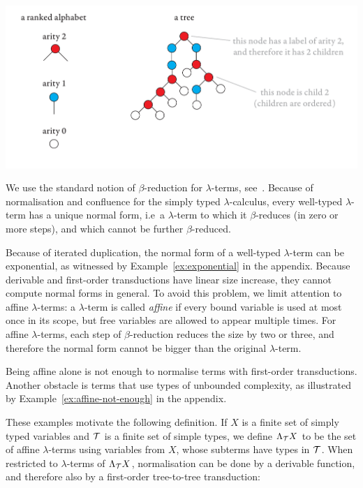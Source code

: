 \begin{center}
\includegraphics[scale=.3, page=45]{pics.pdf}
\end{center}
We use the standard notion of $\beta$-reduction for $\lambda$-terms, see~\cite[Definition 1.2.1]{sorensen_lectures_2006}.  
Because of normalisation and confluence for the simply typed $\lambda$-calculus, every well-typed $\lambda$-term has a unique normal form, i.e~a $\lambda$-term to which it $\beta$-reduces (in zero or more steps), and which cannot be further $\beta$-reduced.

Because of iterated duplication, the normal form of a well-typed $\lambda$-term can be exponential, as witnessed by Example~\ref{ex:exponential} in the appendix.
Because derivable and first-order transductions have linear size increase, they cannot compute normal forms in general. To  avoid this problem, we  limit attention to affine $\lambda$-terms: a $\lambda$-term is called \emph{affine} if every bound variable is used at most once in its scope, but free variables are allowed to appear multiple times. For affine $\lambda$-terms, each step of $\beta$-reduction reduces the size by two or three, and therefore the normal form cannot be bigger than the original $\lambda$-term. 

Being affine alone is not enough to normalise terms with first-order transductions. Another obstacle is terms that use types of unbounded complexity, as illustrated by Example~\ref{ex:affine-not-enough} in the appendix.


These examples motivate the following definition. If $X$ is a finite set of simply typed variables and ${\mathcal T}$ is a finite set of simple types, we define $\Lambda_{\mathcal T} X $ to be the set of affine $\lambda$-terms using variables from $X$, whose subterms have 	 types in $\mathcal T$.  When restricted to $\lambda$-terms of $\Lambda_{\mathcal T} X $, normalisation can be done by a derivable function, and therefore also by a first-order tree-to-tree transduction: 

